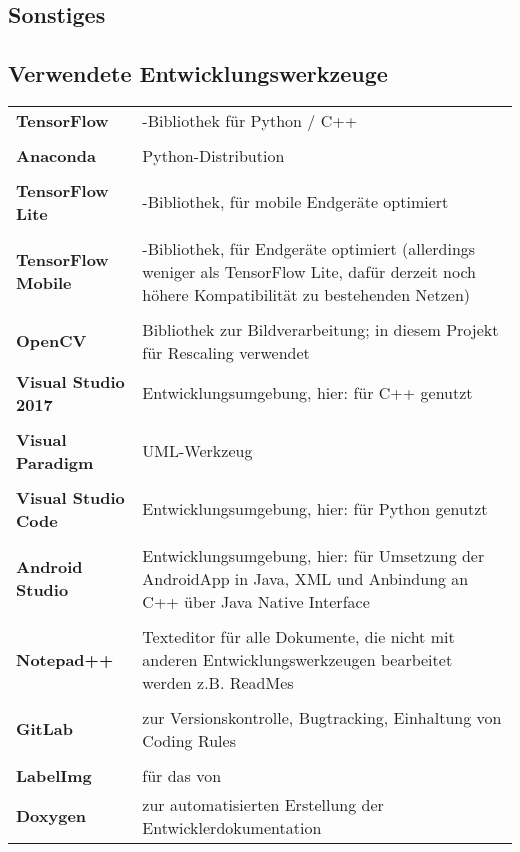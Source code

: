 \begin{appendix}

\chapter{Sonstiges}
\renewcommand{\arraystretch}{1.25}
\section{Verwendete Entwicklungswerkzeuge}
\begin{longtabu}{l X[j]}
    \bfseries TensorFlow & -Bibliothek für Python / C++\\
    &\\
    \bfseries Anaconda & Python-Distribution\\
    &\\
    \bfseries \gls{TensorFlow Lite} &  -Bibliothek, für mobile Endgeräte optimiert\\
    &\\
    \bfseries \gls{TensorFlow Mobile} &  -Bibliothek, für Endgeräte optimiert (allerdings weniger als TensorFlow Lite, dafür derzeit noch höhere Kompatibilität zu bestehenden Netzen)\\
    &\\
    \bfseries OpenCV & Bibliothek zur Bildverarbeitung; in diesem Projekt für Rescaling verwendet
    &\\
    \bfseries Visual Studio 2017 & Entwicklungsumgebung, hier: für C++ genutzt\\
    &\\
    \bfseries Visual Paradigm & UML-Werkzeug\\
    &\\
    \bfseries Visual Studio Code & Entwicklungsumgebung, hier: für Python genutzt\\
    &\\
    \bfseries Android Studio & Entwicklungsumgebung, hier: für Umsetzung der AndroidApp in Java, XML und Anbindung an C++ über Java Native Interface\\
    &\\
    \bfseries Notepad++ & Texteditor für alle Dokumente, die nicht mit anderen Entwicklungswerkzeugen bearbeitet werden z.B. ReadMes\\
    &\\
    \bfseries GitLab & zur Versionskontrolle, Bugtracking, Einhaltung von Coding Rules \\
    &\\
    \bfseries LabelImg\footnotemark & für das  von 
    &\\
    \bfseries Doxygen & zur automatisierten Erstellung der Entwicklerdokumentation
    &\\
\end{longtabu}


\end{appendix}
